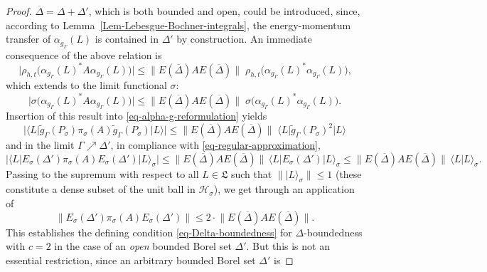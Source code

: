 \documentclass[11pt,twoside,openright]{report}
\theoremstyle{definition}
\theoremstyle{plain}
\theoremstyle{remark}
\theoremstyle{assumption}
\newcommand{\babs}[1]{\bigl\lvert #1 \bigr\rvert}
\newcommand{\norm}[1]{\lVert #1 \rVert}
\newcommand{\ket}[1]{\vert #1 \rangle}
\newcommand{\scp}[2]{\langle #1 \vert #2 \rangle}
\newcommand{\scpx}[3]{\langle #1 \vert #2 \vert #3 \rangle}
\newcommand{\Lfrak}{\mathfrak{L}}
\newcommand{\Hscr}{\mathscr{H}}
\newcommand{\Deltabar}{\overline{\Delta}}
\newcommand{\EDbar}{E ( \overline{\Delta} )}
\newcommand{\EsDprime}{E_\sigma ( \Delta' )}
\newcommand{\agGamma}{\alpha_{g_\Gamma}}
\begin{document}
\begin{proof}
  $\Deltabar = \Delta + \Delta'$, which is both bounded and open,
  could be introduced, since, according to
  Lemma~\ref{Lem-Lebesgue-Bochner-integrals}, the energy-momentum
  transfer of $\agGamma ( L )$ is contained in $\Delta'$ by
  construction. An immediate consequence of the above relation is
  \begin{equation*}
    \babs{\rho_{h , t} \bigl( \agGamma ( L )^* A \agGamma ( L )
    \bigr)} \leqslant \norm{\EDbar A \EDbar} \; \rho_{h , t} \bigl(
    \agGamma ( L )^* \agGamma ( L ) \bigr) \text{,}
  \end{equation*}
  which extends to the limit functional $\sigma$:
  \begin{equation}
    \label{eq-Delta-bound-estimate1}
    \babs{\sigma \bigl( \agGamma ( L )^* A \agGamma ( L ) \bigr)}
    \leqslant \norm{\EDbar A \EDbar} \; \sigma \bigl( \agGamma ( L )^*
    \agGamma ( L ) \bigr) \text{.}
  \end{equation}
  Insertion of this result into \eqref{eq-alpha-g-reformulation}
  yields
  \begin{equation}
    \label{eq-Delta-bound-estimate2}
    \babs{\scpx{L}{\tilde{g}_\Gamma ( P_\sigma ) \pi_\sigma ( A )
    \tilde{g}_\Gamma ( P_\sigma )}{L}} \leqslant \norm{\EDbar A
    \EDbar} \; \scpx{L}{\tilde{g}_\Gamma ( P_\sigma )^2}{L}
  \end{equation}
  and in the limit $\Gamma \nearrow \Delta'$, in compliance with
  \eqref{eq-regular-approximation},
  \begin{equation}
    \label{eq-Delta-bound-estimate3}
    \babs{\scpx{L}{\EsDprime \pi_\sigma ( A ) \EsDprime}{L}_\sigma}
    \leqslant \norm{\EDbar A \EDbar} \, \scpx{L}{\EsDprime}{L}_\sigma
    \leqslant \norm{\EDbar A \EDbar} \, \scp{L}{L}_\sigma \text{.}
  \end{equation}
  Passing to the supremum with respect to all $L \in \Lfrak$ such that
  $\norm{\ket{L}_\sigma} \leqslant 1$ (these constitute a dense subset
  of the unit ball in $\Hscr_\sigma$), we get through an application
  of \cite[Satz~4.4]{weidmann:1976}
  \begin{equation}
    \label{eq-Delta-final-bound1}
    \norm{\EsDprime \pi_\sigma ( A ) \EsDprime} \leqslant 2 \cdot
    \norm{\EDbar A \EDbar} \text{.}
  \end{equation}
  This establishes the defining condition \eqref{eq-Delta-boundedness}
  for $\Delta$-boundedness with $c = 2$ in the case of an \emph{open}
  bounded Borel set $\Delta'$. But this is not an essential
  restriction, since an arbitrary bounded Borel set $\Delta'$ is

\end{proof}
\end{document}
